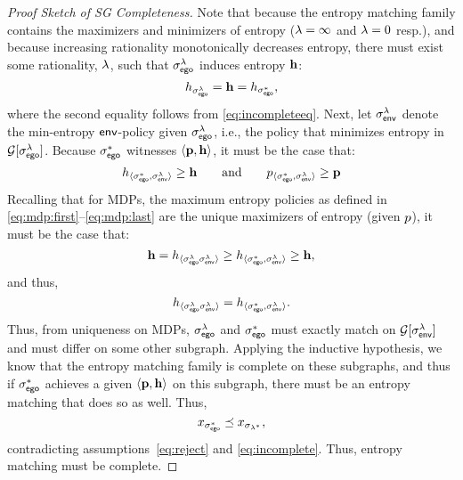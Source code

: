 \begin{proof}[Proof Sketch of SG Completeness]
  Note that because the entropy matching family contains the maximizers and minimizers
  of entropy ($\lambda = \infty$ and $\lambda = 0$ resp.), and because increasing rationality monotonically decreases entropy,
  there must exist some rationality, $\lambda$, such that $\sigma_{\mathsf{ego}}^\lambda$ induces entropy $\mathbf{h}$:
  \begin{equation}
    h_{\sigma_{\mathsf{ego}}^\lambda} = \mathbf{h} = h_{\sigma_{\mathsf{ego}}^*},
  \end{equation}
  where the second equality follows from \eqref{eq:incompleteeq}.
  Next, let $\sigma_{\mathsf{env}}^\lambda$ denote the min-entropy
  $\mathsf{env}$-policy given $\sigma_{\mathsf{ego}}^{\lambda}$, i.e., the policy that minimizes entropy in $\mathcal{G}[\sigma_{\mathsf{ego}}^{\lambda}]$.  
  Because $\sigma_{\mathsf{ego}}^*$
  witnesses $\langle\mathbf{p}, \mathbf{h}\rangle$, it must be the case
  that:
  \begin{equation}\label{eq:pareto_bound_for_rat}
    \rndp_{\langle \sched_\pOne^*, \sched_\pTwo^\rat \rangle} \geq \randomness
    \hspace{2em} \text{and} \hspace{2em}
    \scp_{\langle \sched_\pOne^*, \sched_\pTwo^\rat\rangle} \geq \scthreshold
  \end{equation}
  Recalling that for MDPs, the maximum entropy policies as defined in \eqref{eq:mdp:first}--\eqref{eq:mdp:last}  are the unique maximizers of entropy (given $p$),
  it must be the case that:
  \begin{equation}
    \mathbf{h} = h_{\langle \sigma_{\mathsf{ego}}^\lambda \sigma_{\mathsf{env}}^\lambda \rangle} \geq  h_{\langle \sigma_{\mathsf{ego}}^*, \sigma_{\mathsf{env}}^\lambda \rangle}\geq \mathbf{h},
  \end{equation}
  and thus,
  \begin{equation}
    h_{\langle \sigma_{\mathsf{ego}}^\lambda \sigma_{\mathsf{env}}^\lambda \rangle} =  h_{\langle \sigma_{\mathsf{ego}}^*, \sigma_{\mathsf{env}}^\lambda \rangle}.
  \end{equation}
  Thus, from uniqueness on MDPs, $\sigma_{\mathsf{ego}}^\lambda$ and
  $\sigma_{\mathsf{ego}}^*$ must exactly match on $\mathcal{G}[\sigma_{\mathsf{env}}^\lambda]$ and
  must differ on some other subgraph.  Applying the inductive
  hypothesis, we know that the entropy matching family is complete on
  these subgraphs, and thus if $\sigma_{\mathsf{ego}}^*$ achieves a given
  $\langle\mathbf{p}, \mathbf{h}\rangle$ on this subgraph, there
  must be an entropy matching that does so as well. Thus,
  \begin{equation}
    x_{\sigma_{\mathsf{ego}}^*} \preceq x_{\sigma_{\lambda^*}},
  \end{equation}
  contradicting
  assumptions~\eqref{eq:reject} and \eqref{eq:incomplete}.  Thus,
  entropy matching must be complete.
\end{proof}

